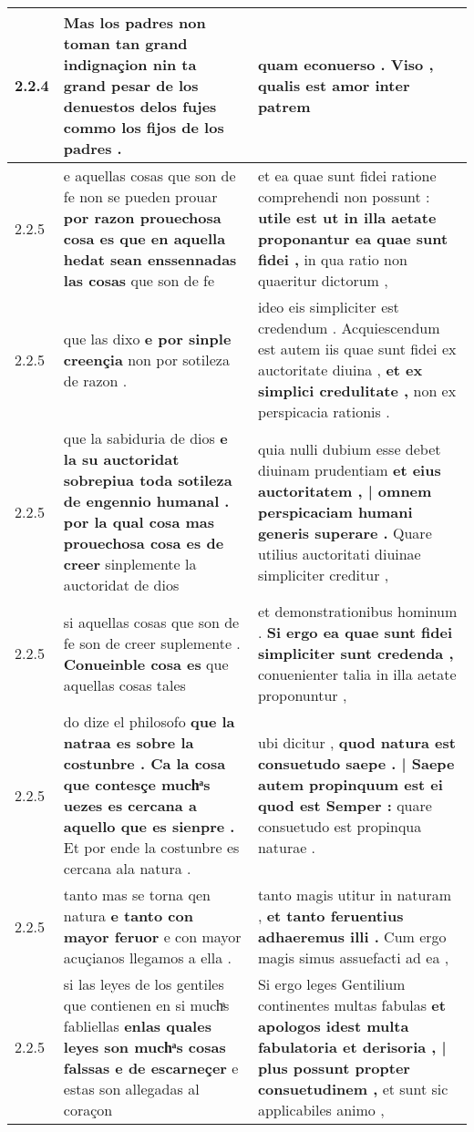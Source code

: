 \begin{tabular}{|p{1cm}|p{6.5cm}|p{6.5cm}|}
2.2.4 & Mas los padres non toman tan grand indignaçion \textbf{ nin ta grand pesar de los denuestos delos fujes } commo los fijos de los padres . & quam econuerso . Viso , \textbf{ qualis est amor } inter patrem \\\hline
2.2.5 & e aquellas cosas que son de fe non se pueden prouar \textbf{ por razon prouechosa cosa es que en aquella hedat sean enssennadas las cosas } que son de fe & et ea quae sunt fidei ratione comprehendi non possunt : \textbf{ utile est ut in illa aetate proponantur ea quae sunt fidei , } in qua ratio non quaeritur dictorum , \\\hline
2.2.5 & que las dixo \textbf{ e por sinple creençia } non por sotileza de razon . & ideo eis simpliciter est credendum . Acquiescendum est autem iis quae sunt fidei ex auctoritate diuina , \textbf{ et ex simplici credulitate , } non ex perspicacia rationis . \\\hline
2.2.5 & que la sabiduria de dios \textbf{ e la su auctoridat sobrepiua toda sotileza de engennio humanal . por la qual cosa mas prouechosa cosa es de creer } sinplemente la auctoridat de dios & quia nulli dubium esse debet diuinam prudentiam \textbf{ et eius auctoritatem , | omnem perspicaciam humani generis superare . } Quare utilius auctoritati diuinae simpliciter creditur , \\\hline
2.2.5 & si aquellas cosas que son de fe son de creer suplemente . \textbf{ Conueinble cosa es } que aquellas cosas tales & et demonstrationibus hominum . \textbf{ Si ergo ea quae sunt fidei simpliciter sunt credenda , } conuenienter talia in illa aetate proponuntur , \\\hline
2.2.5 & do dize el philosofo \textbf{ que la natraa es sobre la costunbre . Ca la cosa que contesçe muchͣs uezes es cercana a aquello que es sienpre . } Et por ende la costunbre es cercana ala natura . & ubi dicitur , \textbf{ quod natura est consuetudo saepe . | Saepe autem propinquum est ei quod est Semper : } quare consuetudo est propinqua naturae . \\\hline
2.2.5 & tanto mas se torna qen natura \textbf{ e tanto con mayor feruor } e con mayor acuçianos llegamos a ella . & tanto magis utitur in naturam , \textbf{ et tanto feruentius adhaeremus illi . } Cum ergo magis simus assuefacti ad ea , \\\hline
2.2.5 & si las leyes de los gentiles que contienen en si muchͣs fabliellas \textbf{ enlas quales leyes son muchͣs cosas falssas e de escarneçer } e estas son allegadas al coraçon & Si ergo leges Gentilium continentes multas fabulas \textbf{ et apologos idest multa fabulatoria et derisoria , | plus possunt propter consuetudinem , } et sunt sic applicabiles animo , \\\hline

\end{tabular}
